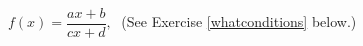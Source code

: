 {$f(x) = \dfrac{ax + b}{cx + d},\;$ (See Exercise \ref{whatconditions} below.)\label{genericinverselast}}
{}